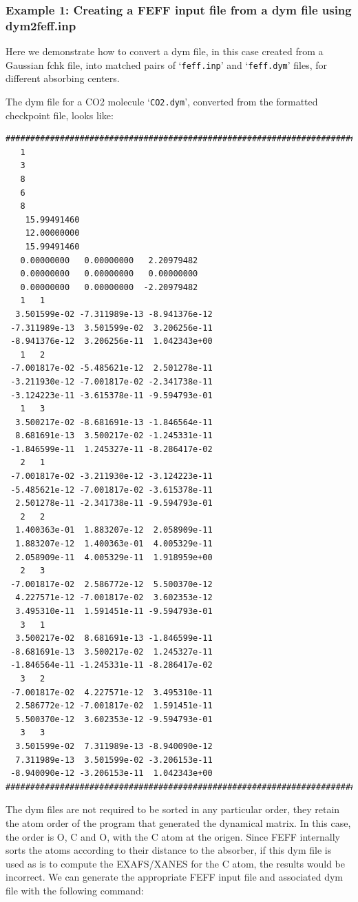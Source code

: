 \documentclass[11pt,oneside]{report} %
\newcommand{\file}[1]{`\texttt{#1}'}
\begin{document}
\subsubsection{Example 1: Creating a FEFF input file from a dym file using dym2feff.inp}
 
 Here we demonstrate how to convert a dym file, in this case created from a
Gaussian fchk file, into matched pairs of \file{feff.inp} and \file{feff.dym} files, for
different absorbing centers.

The dym file for a CO2 molecule \file{CO2.dym}, converted from the formatted
checkpoint file, looks like:
\begin{verbatim}
###############################################################################
   1
   3
   8
   6
   8
    15.99491460
    12.00000000
    15.99491460
   0.00000000   0.00000000   2.20979482
   0.00000000   0.00000000   0.00000000
   0.00000000   0.00000000  -2.20979482
   1   1
  3.501599e-02 -7.311989e-13 -8.941376e-12
 -7.311989e-13  3.501599e-02  3.206256e-11
 -8.941376e-12  3.206256e-11  1.042343e+00
   1   2
 -7.001817e-02 -5.485621e-12  2.501278e-11
 -3.211930e-12 -7.001817e-02 -2.341738e-11
 -3.124223e-11 -3.615378e-11 -9.594793e-01
   1   3
  3.500217e-02 -8.681691e-13 -1.846564e-11
  8.681691e-13  3.500217e-02 -1.245331e-11
 -1.846599e-11  1.245327e-11 -8.286417e-02
   2   1
 -7.001817e-02 -3.211930e-12 -3.124223e-11
 -5.485621e-12 -7.001817e-02 -3.615378e-11
  2.501278e-11 -2.341738e-11 -9.594793e-01
   2   2
  1.400363e-01  1.883207e-12  2.058909e-11
  1.883207e-12  1.400363e-01  4.005329e-11
  2.058909e-11  4.005329e-11  1.918959e+00
   2   3
 -7.001817e-02  2.586772e-12  5.500370e-12
  4.227571e-12 -7.001817e-02  3.602353e-12
  3.495310e-11  1.591451e-11 -9.594793e-01
   3   1
  3.500217e-02  8.681691e-13 -1.846599e-11
 -8.681691e-13  3.500217e-02  1.245327e-11
 -1.846564e-11 -1.245331e-11 -8.286417e-02
   3   2
 -7.001817e-02  4.227571e-12  3.495310e-11
  2.586772e-12 -7.001817e-02  1.591451e-11
  5.500370e-12  3.602353e-12 -9.594793e-01
   3   3
  3.501599e-02  7.311989e-13 -8.940090e-12
  7.311989e-13  3.501599e-02 -3.206153e-11
 -8.940090e-12 -3.206153e-11  1.042343e+00
###############################################################################
\end{verbatim}
The dym files are not required to be sorted in any particular order, they retain
the atom order of the program that generated the dynamical matrix. In this case,
the order is O, C and O, with the C atom at the origen. Since FEFF internally
sorts the atoms according to their distance to the absorber, if this dym file is
used as is to compute the EXAFS/XANES for the C atom, the results would be
incorrect. We can generate the appropriate FEFF input file and associated dym
file with the following command:
\end{document}
